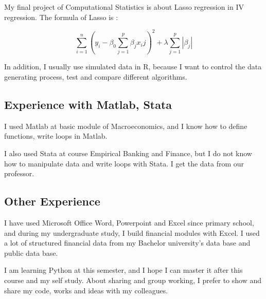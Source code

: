 My final project of Computational Statistics is about Lasso regression in IV regression.
The formula of Lasso is :

\begin{equation*}
\sum_{i = 1}^{n}  ( y_i - \beta_0 \sum_{j = 1}^{p} \beta_j x_ij )^2 + \lambda\sum_{j = 1}^{p} | \beta_j|
\end{equation*}

In addition, I usually use simulated data in R, because I want to control the data generating process, test and compare different algorithms. 

\subsection{Experience with Matlab, Stata}
I used Matlab at basic module of Macroeconomics, and I know how to define functions, write loops in Matlab.\newline

\noindent
I also used Stata at course Empirical Banking and Finance, but I do not know how to manipulate data and write loops with Stata. I get the data from our professor. 

\subsection{Other Experience}
I have used Microsoft Office Word, Powerpoint and Excel since primary school, and during my undergraduate study, I build financial modules with Excel. I used a lot of structured financial data from my Bachelor university's data base and public data base.  \newline

\noindent
I am learning Python at this semester, and I hope I can master it after this course and my self study. About sharing and group working, I prefer to show and share my code, works and ideas with my colleagues. 





